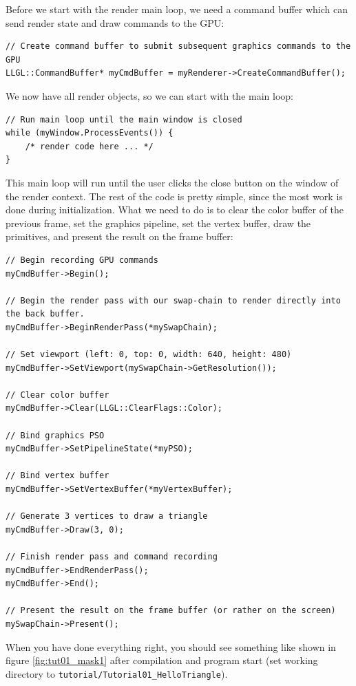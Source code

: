 \documentclass{article}
\begin{document}
Before we start with the render main loop, we need a command buffer which can send render state and draw commands to the GPU:
\begin{lstlisting}
// Create command buffer to submit subsequent graphics commands to the GPU
LLGL::CommandBuffer* myCmdBuffer = myRenderer->CreateCommandBuffer();
\end{lstlisting}
We now have all render objects, so we can start with the main loop:
\begin{lstlisting}
// Run main loop until the main window is closed
while (myWindow.ProcessEvents()) {
    /* render code here ... */
}
\end{lstlisting}
This main loop will run until the user clicks the close button on the window of the render context.
The rest of the code is pretty simple, since the most work is done during initialization.
What we need to do is to clear the color buffer of the previous frame,
set the graphics pipeline, set the vertex buffer, draw the primitives, and present the result on the frame buffer:
\begin{lstlisting}
// Begin recording GPU commands
myCmdBuffer->Begin();

// Begin the render pass with our swap-chain to render directly into the back buffer.
myCmdBuffer->BeginRenderPass(*mySwapChain);

// Set viewport (left: 0, top: 0, width: 640, height: 480)
myCmdBuffer->SetViewport(mySwapChain->GetResolution());

// Clear color buffer
myCmdBuffer->Clear(LLGL::ClearFlags::Color);

// Bind graphics PSO
myCmdBuffer->SetPipelineState(*myPSO);

// Bind vertex buffer
myCmdBuffer->SetVertexBuffer(*myVertexBuffer);

// Generate 3 vertices to draw a triangle
myCmdBuffer->Draw(3, 0);

// Finish render pass and command recording
myCmdBuffer->EndRenderPass();
myCmdBuffer->End();

// Present the result on the frame buffer (or rather on the screen)
mySwapChain->Present();
\end{lstlisting}
When you have done everything right, you should see something like shown in figure \ref{fig:tut01_mask1} after compilation
and program start (set working directory to \texttt{tutorial/Tutorial01\_HelloTriangle}).
\end{document}
